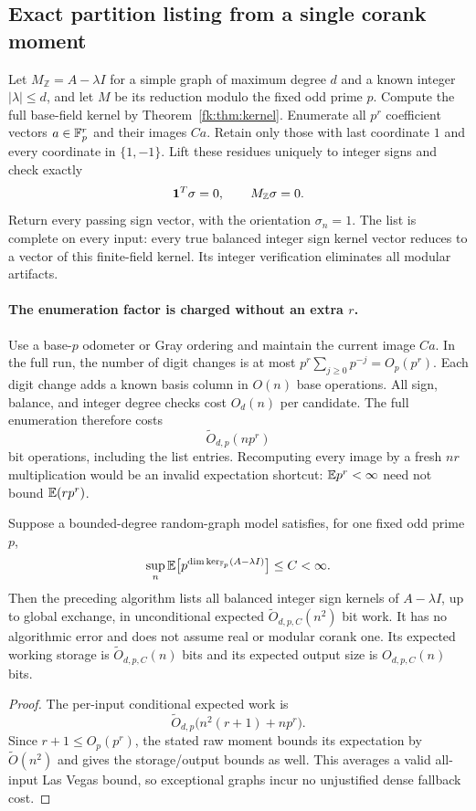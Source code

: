 \subsection{Exact partition listing from a single corank moment}
Let $M_{\mathbb Z}=A-\lambda I$ for a simple graph of maximum degree
$d$ and a known integer $|\lambda|\le d$, and let $M$ be its reduction modulo
the fixed odd prime $p$. Compute the full base-field kernel by
Theorem~\ref{fk:thm:kernel}. Enumerate all $p^r$ coefficient vectors
$a\in\mathbb F_p^r$ and their images $Ca$.
Retain only those with last coordinate $1$ and every coordinate in
$\{1,-1\}$. Lift these residues uniquely to integer signs and
check exactly
\[
 \mathbf 1^T\sigma=0,\qquad M_{\mathbb Z}\sigma=0.
\]
Return every passing sign vector, with the orientation $\sigma_n=1$.
The list is complete on every input: every true balanced integer
sign kernel vector reduces to a vector of this finite-field kernel.
Its integer verification eliminates all modular artifacts.

\paragraph{The enumeration factor is charged without an extra $r$.}
Use a base-$p$ odometer or Gray ordering and maintain the current
image $Ca$. In the full run, the number of digit changes is at most
$p^r\sum_{j\ge0}p^{-j}=O_p(p^r)$.
Each digit change adds a known basis column in $O(n)$ base operations.
All sign, balance, and integer degree checks cost $O_d(n)$ per
candidate. The full enumeration therefore costs
\[
 \widetilde O_{d,p}(n p^r)
\]
bit operations, including the list entries. Recomputing every image
by a fresh $nr$ multiplication would be an invalid expectation
shortcut: $\mathbb E p^r<\infty$ need not bound $\mathbb E(rp^r)$.

\begin{corollary}\label{fk:cor:moment}
Suppose a bounded-degree random-graph model satisfies, for one fixed
odd prime $p$,
\[
 \sup_n\mathbb E\bigl[p^{\dim\ker_{\mathbb F_p}(A-\lambda I)}\bigr]\le C<\infty.
\]
Then the preceding algorithm lists all balanced integer sign kernels
of $A-\lambda I$, up to global exchange, in unconditional expected
$\widetilde O_{d,p,C}(n^2)$ bit work. It has no algorithmic error
and does not assume real or modular corank one. Its expected working
storage is $\widetilde O_{d,p,C}(n)$ bits and its expected output
size is $O_{d,p,C}(n)$ bits.
\end{corollary}
\begin{proof}
The per-input conditional expected work is
\[
 \widetilde O_{d,p}\bigl(n^2(r+1)+n p^r\bigr).
\]
Since $r+1\le O_p(p^r)$, the stated raw moment bounds its expectation
by $\widetilde O(n^2)$ and gives the storage/output bounds as well.
This averages a valid all-input Las Vegas bound, so exceptional
graphs incur no unjustified dense fallback cost.
\end{proof}

